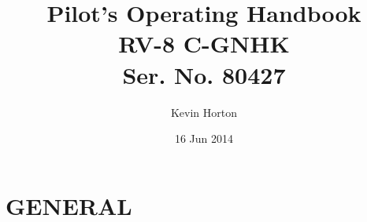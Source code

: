 \title{Pilot's Operating Handbook\\
[1in]RV-8 C-GNHK\\
[0.25in]Ser. No. 80427}

\author{Kevin Horton}

\date{16 Jun 2014}

\maketitle \clearpage

\cleardoublepage \setcounter{tocdepth}{0} 

\tableofcontents{}

\clearpage

\mainmatter

\chapter{GENERAL} \vspace{\minitocspacebefore} \minitoc \clearpage


